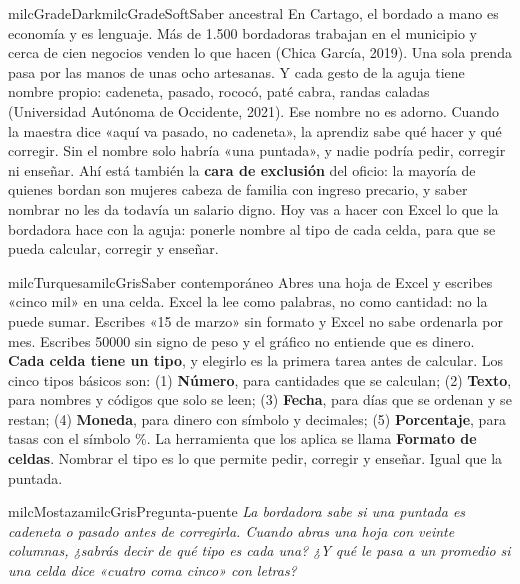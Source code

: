 \documentclass[11pt,letterpaper]{article}
\begin{document}
\begin{softbox}{milcGradeDark}{milcGradeSoft}{Saber ancestral}
En Cartago, el bordado a mano es economía y es lenguaje. Más de 1.500 bordadoras trabajan en el municipio y cerca de cien negocios venden lo que hacen (Chica García, 2019). Una sola prenda pasa por las manos de unas ocho artesanas. Y cada gesto de la aguja tiene nombre propio: cadeneta, pasado, rococó, paté cabra, randas caladas (Universidad Autónoma de Occidente, 2021). Ese nombre no es adorno. Cuando la maestra dice «aquí va pasado, no cadeneta», la aprendiz sabe qué hacer y qué corregir. Sin el nombre solo habría «una puntada», y nadie podría pedir, corregir ni enseñar. Ahí está también la \textbf{cara de exclusión} del oficio: la mayoría de quienes bordan son mujeres cabeza de familia con ingreso precario, y saber nombrar no les da todavía un salario digno. Hoy vas a hacer con Excel lo que la bordadora hace con la aguja: ponerle nombre al tipo de cada celda, para que se pueda calcular, corregir y enseñar.\par{}
\end{softbox}

\begin{softbox}{milcTurquesa}{milcGris}{Saber contemporáneo}
Abres una hoja de Excel y escribes «cinco mil» en una celda. Excel la lee como palabras, no como cantidad: no la puede sumar. Escribes «15 de marzo» sin formato y Excel no sabe ordenarla por mes. Escribes 50000 sin signo de peso y el gráfico no entiende que es dinero. \textbf{Cada celda tiene un tipo}, y elegirlo es la primera tarea antes de calcular. Los cinco tipos básicos son: (1) \textbf{Número}, para cantidades que se calculan; (2) \textbf{Texto}, para nombres y códigos que solo se leen; (3) \textbf{Fecha}, para días que se ordenan y se restan; (4) \textbf{Moneda}, para dinero con símbolo y decimales; (5) \textbf{Porcentaje}, para tasas con el símbolo \%. La herramienta que los aplica se llama \textbf{Formato de celdas}. Nombrar el tipo es lo que permite pedir, corregir y enseñar. Igual que la puntada.
\end{softbox}

\begin{softbox}{milcMostaza}{milcGris}{Pregunta-puente}
\textit{La bordadora sabe si una puntada es cadeneta o pasado antes de corregirla. Cuando abras una hoja con veinte columnas, ¿sabrás decir de qué tipo es cada una? ¿Y qué le pasa a un promedio si una celda dice «cuatro coma cinco» con letras?}
\end{softbox}
\end{document}

